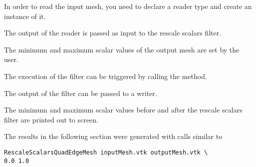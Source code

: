 \documentclass{InsightArticle}
\begin{document}
\begin{center}

\end{center}

In order to read the input mesh, you need to declare a reader type and create an instance of it.

\begin{center}

\end{center}

The output of the reader is passed as input to the rescale scalars filter.

\begin{center}

\end{center}

The minimum and maximum scalar values of the output mesh are set by the user.

\begin{center}

\end{center}

The execution of the filter can be triggered by calling the  method.

\begin{center}

\end{center}

The output of the filter can be passed to a writer. 

\begin{center}

\end{center}

The minimum and maximum scalar values before and after the rescale scalars filter are printed out
to screen.

\begin{center}

\end{center}

The results in the following section were generated with calls similar to

\begin{verbatim}
RescaleScalarsQuadEdgeMesh inputMesh.vtk outputMesh.vtk \
0.0 1.0
\end{verbatim}
\end{document}
